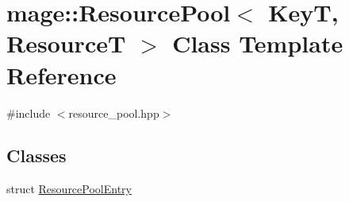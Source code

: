 \hypertarget{classmage_1_1_resource_pool}{}\section{mage\+:\+:Resource\+Pool$<$ KeyT, ResourceT $>$ Class Template Reference}
\label{classmage_1_1_resource_pool}


{\ttfamily \#include $<$resource\+\_\+pool.\+hpp$>$}

\subsection*{Classes}
\begin{DoxyCompactItemize}
\item 
struct \hyperlink{structmage_1_1_resource_pool_1_1_resource_pool_entry}{Resource\+Pool\+Entry}
\end{DoxyCompactItemize}
